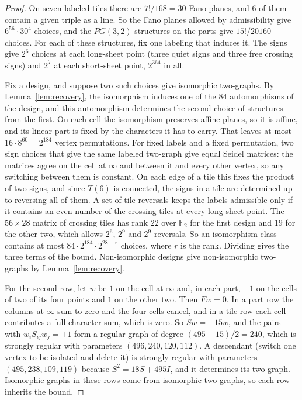\documentclass[11pt]{amsart}
\theoremstyle{remark}
\newcommand{\F}{\mathbb{F}}
\begin{document}
\begin{proof}
On seven labeled tiles there are $7!/168=30$ Fano planes, and $6$ of them contain a given triple as a line. So the Fano planes allowed by admissibility give $6^{56}\cdot30^4$ choices, and the $PG(3,2)$ structures on the parts give $15!/20160$ choices. For each of these structures, fix one labeling that induces it. The signs give $2^6$ choices at each long-sheet point (three quiet signs and three free crossing signs) and $2^7$ at each short-sheet point, $2^{364}$ in all.

Fix a design, and suppose two such choices give isomorphic two-graphs. By Lemma~\ref{lem:recovery}, the isomorphism induces one of the $84$ automorphisms of the design, and this automorphism determines the second choice of structures from the first. On each cell the isomorphism preserves affine planes, so it is affine, and its linear part is fixed by the characters it has to carry. That leaves at most $16\cdot8^{60}=2^{184}$ vertex permutations. For fixed labels and a fixed permutation, two sign choices that give the same labeled two-graph give equal Seidel matrices: the matrices agree on the cell at $\infty$ and between it and every other vertex, so any switching between them is constant. On each edge of a tile this fixes the product of two signs, and since $T(6)$ is connected, the signs in a tile are determined up to reversing all of them. A set of tile reversals keeps the labels admissible only if it contains an even number of the crossing tiles at every long-sheet point. The $56\times28$ matrix of crossing tiles has rank $22$ over $\F_2$ for the first design and $19$ for the other two, which allows $2^6$, $2^9$ and $2^9$ reversals. So an isomorphism class contains at most $84\cdot2^{184}\cdot2^{28-r}$ choices, where $r$ is the rank. Dividing gives the three terms of the bound. Non-isomorphic designs give non-isomorphic two-graphs by Lemma~\ref{lem:recovery}.

For the second row, let $w$ be $1$ on the cell at $\infty$ and, in each part, $-1$ on the cells of two of its four points and $1$ on the other two. Then $Fw=0$. In a part row the columns at $\infty$ sum to zero and the four cells cancel, and in a tile row each cell contributes a full character sum, which is zero. So $Sw=-15w$, and the pairs with $w_iS_{ij}w_j=+1$ form a regular graph of degree $(495-15)/2=240$, which is strongly regular with parameters $(496,240,120,112)$. A descendant (switch one vertex to be isolated and delete it) is strongly regular with parameters $(495,238,109,119)$ because $S^2=18S+495I$, and it determines its two-graph. Isomorphic graphs in these rows come from isomorphic two-graphs, so each row inherits the bound.
\end{proof}
\end{document}
